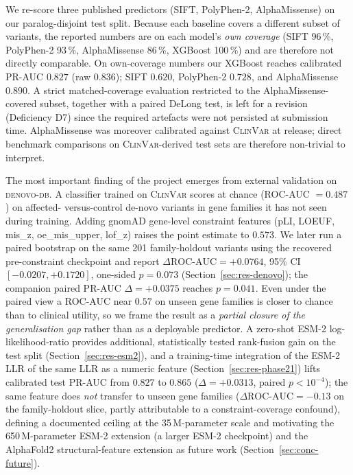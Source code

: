 \documentclass[11pt,a4paper,oneside]{report}
\begin{document}
We re-score three published predictors (SIFT, PolyPhen-2, AlphaMissense)
on our paralog-disjoint test split. Because each baseline covers a
different subset of variants, the reported numbers are on each model's
\emph{own coverage} (SIFT 96\,\%, PolyPhen-2 93\,\%, AlphaMissense
86\,\%, XGBoost 100\,\%) and are therefore not directly comparable. On
own-coverage numbers our XGBoost reaches calibrated PR-AUC $0.827$
(raw $0.836$); SIFT $0.620$, PolyPhen-2 $0.728$, and AlphaMissense
$0.890$. A strict
matched-coverage evaluation restricted to the AlphaMissense-covered
subset, together with a paired DeLong test, is left for a revision
(Deficiency D7) since the required artefacts were not persisted at
submission time. AlphaMissense was moreover calibrated against
\textsc{ClinVar} at release; direct benchmark comparisons on
\textsc{ClinVar}-derived test sets are therefore non-trivial to
interpret.

The most important finding of the project emerges from external
validation on \textsc{denovo-db}. A classifier trained on
\textsc{ClinVar} scores at chance (ROC-AUC $= 0.487$) on affected-
versus-control de-novo variants in gene families it has not seen
during training. Adding gnomAD gene-level constraint features (pLI,
LOEUF, mis\_z, oe\_mis\_upper, lof\_z) raises the point estimate to
$0.573$. We later run a paired bootstrap on the same 201 family-holdout
variants using the recovered pre-constraint checkpoint and report
$\Delta\text{ROC-AUC}=+0.0764$, 95\% CI $[-0.0207, +0.1720]$, one-sided
$p=0.073$ (Section~\ref{sec:res-denovo}); the companion paired PR-AUC
$\Delta=+0.0375$ reaches $p=0.041$. Even under the paired view a
ROC-AUC near $0.57$ on unseen gene families is closer to chance than
to clinical utility, so we frame the result as a \emph{partial closure
of the generalisation gap} rather than as a deployable predictor. A
zero-shot ESM-2 log-likelihood-ratio provides additional, statistically
tested rank-fusion gain on the test split (Section~\ref{sec:res-esm2}),
and a training-time integration of the ESM-2 LLR of the same LLR as a numeric
feature (Section~\ref{sec:res-phase21}) lifts calibrated test PR-AUC
from $0.827$ to $0.865$ ($\Delta=+0.0313$, paired $p<10^{-4}$);
the same feature does \emph{not} transfer to unseen gene families
($\Delta\text{ROC-AUC}=-0.13$ on the family-holdout slice, partly
attributable to a constraint-coverage confound), defining a documented
ceiling at the 35\,M-parameter scale and motivating the 650\,M-parameter ESM-2 extension (a
larger ESM-2 checkpoint) and the AlphaFold2 structural-feature extension
as future work (Section~\ref{sec:conc-future}).
\end{document}
